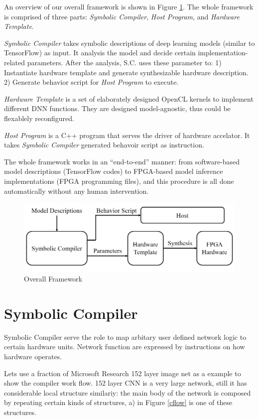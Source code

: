 \documentclass{acm_proc_article-sp-copy}
\begin{document}
An overview of our overall framework is shown in Figure \ref{framework}. The whole framework is comprised of three parts: {\em Symbolic Compiler}, {\em Host Program}, and {\em Hardware Template}.

{\em Symbolic Compiler} takes symbolic descriptions of deep learning models (similar to TensorFlow) as input. It analysis the model and decide certain implementation-related parameters. After the analysis, S.C. uses these parameter to: 1) Instantiate hardware template and generate synthesizable hardware description. 2) Generate behavior script for {\em Host Program} to execute.

{\em Hardware Template} is a set of elaborately designed OpenCL kernels to implement different DNN functions. They are designed model-agnostic, thus could be flexablely reconfigured.

{\em Host Program} is a C++ program that serves the driver of hardware accelator. It takes {\em Symbolic Compiler} generated behavoir script as instruction.

The whole framework works in an ``end-to-end'' manner: from software-based model descriptions (TensorFlow codes) to FPGA-based model inference implementations (FPGA programming files), and this procedure is all done automatically without any human intervention.

\begin{figure}
	\centering
	\includegraphics[width=1.0\linewidth]{./figure/z/framework.png}
	\caption{Overall Framework}
	\label{framework}
\end{figure}

\section{Symbolic Compiler}
Symbolic Compiler serve the role to map arbitary user defined network logic to certain hardware units. Network function are expressed by instructions on how hardware operates. 

Lets use a fraction of Microsoft Research 152 layer image net as a example to show the compiler work flow. 152 layer CNN is a very large network, still it has considerable local structure similariy: the main body of the network is composed by repeating certain kinds of structures, a) in Figure \ref{cflow} is one of these structures.
\end{document}
